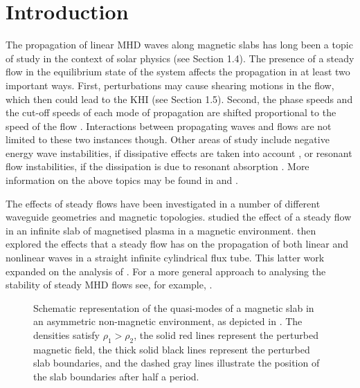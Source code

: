 \documentclass[12pt]{ociamthesis}
\begin{document}
\section{Introduction}
\label{sec:c2intro}

The propagation of linear MHD waves along magnetic slabs has long been a topic of study in the context of solar physics (see Section 1.4).
The presence of a steady flow in the equilibrium state of the system affects the propagation in at least two important ways.
First, perturbations may cause shearing motions in the flow, which then could lead to the KHI (see Section 1.5).
Second, the phase speeds and the cut-off speeds of each mode of propagation are shifted proportional to the speed of the flow \citep{Nakariakov1995, Terra-Homem2003}.
Interactions between propagating waves and flows are not limited to these two instances though.
Other areas of study include negative energy wave instabilities, if dissipative effects are taken into account \citep{Cairns1979, Joarder1997}, or resonant flow instabilities, if the dissipation is due to resonant absorption \citep[see][]{Tirry1998, Taroyan2002}. More information on the above topics may be found in \cite{Taroyan2011} and \cite{Ryutova2015}.

The effects of steady flows have been investigated in a number of different waveguide geometries and magnetic topologies.
\cite{Nakariakov1995} studied the effect of a steady flow in an infinite slab of magnetised plasma in a magnetic environment.
\cite{Terra-Homem2003} then explored the effects that a steady flow has on the propagation of both linear and nonlinear waves in a straight infinite cylindrical flux tube.
This latter work expanded on the analysis of \cite{Somasundaram1999}.
For a more general approach to analysing the stability of steady MHD flows see, for example, \cite{Goedbloed2009a, Goedbloed2009b, Goedbloed2018a, Goedbloed2018b}.

\begin{figure}[t]
\centering
{}
\caption{Schematic representation of the quasi-modes of a magnetic slab in an asymmetric non-magnetic environment, as depicted in \cite{Allcock2017}.
The densities satisfy $\rho_1 > \rho_2$, the solid red lines represent the perturbed magnetic field, the thick solid black lines represent the perturbed slab boundaries, and the dashed gray lines illustrate the position of the slab boundaries after half a period.}
\label{fig:quasimodes}
\end{figure}
\end{document}
